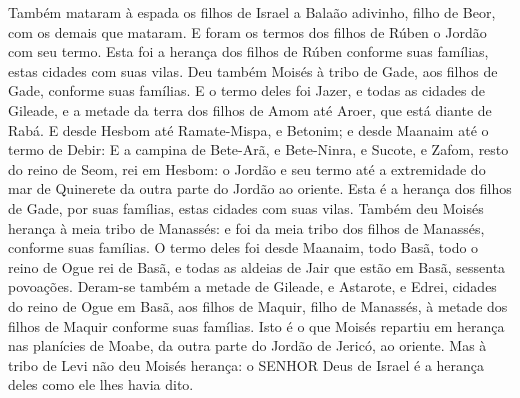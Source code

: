 {Também mataram à espada os filhos de Israel a Balaão adivinho, filho de Beor, com os demais que mataram.
E foram os termos dos filhos de Rúben o Jordão com seu termo. Esta foi a herança dos filhos de Rúben conforme suas famílias, estas cidades com suas vilas.
Deu também Moisés à tribo de Gade, aos filhos de Gade, conforme suas famílias.
E o termo deles foi Jazer, e todas as cidades de Gileade, e a metade da terra dos filhos de Amom até Aroer, que está diante de Rabá.
E desde Hesbom até Ramate-Mispa, e Betonim; e desde Maanaim até o termo de Debir:
E a campina de Bete-Arã, e Bete-Ninra, e Sucote, e Zafom, resto do reino de Seom, rei em Hesbom: o Jordão e seu termo até a extremidade do mar de Quinerete da outra parte do Jordão ao oriente.
Esta é a herança dos filhos de Gade, por suas famílias, estas cidades com suas vilas.
Também deu Moisés herança à meia tribo de Manassés: e foi da meia tribo dos filhos de Manassés, conforme suas famílias.
O termo deles foi desde Maanaim, todo Basã, todo o reino de Ogue rei de Basã, e todas as aldeias de Jair que estão em Basã, sessenta povoações.
Deram-se também a metade de Gileade, e Astarote, e Edrei, cidades do reino de Ogue em Basã, aos filhos de Maquir, filho de Manassés, à metade dos filhos de Maquir conforme suas famílias.
Isto é o que Moisés repartiu em herança nas planícies de Moabe, da outra parte do Jordão de Jericó, ao oriente.
Mas à tribo de Levi não deu Moisés herança: o SENHOR Deus de Israel é a herança deles como ele lhes havia dito.

\par }

